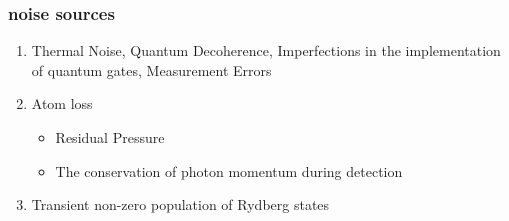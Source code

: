 \documentclass[18 pt]{beamer}
\begin{document}
\begin{frame}
\frametitle{noise sources}
\begin{enumerate}
  \item Thermal Noise, Quantum Decoherence, Imperfections in the implementation of quantum gates, Measurement Errors
  \item Atom loss
  \begin{itemize}
    \item Residual Pressure
    \item The conservation of photon momentum during detection
  \end{itemize}
  \item Transient non-zero population of Rydberg states
\end{enumerate}
\end{frame}
\end{document}
